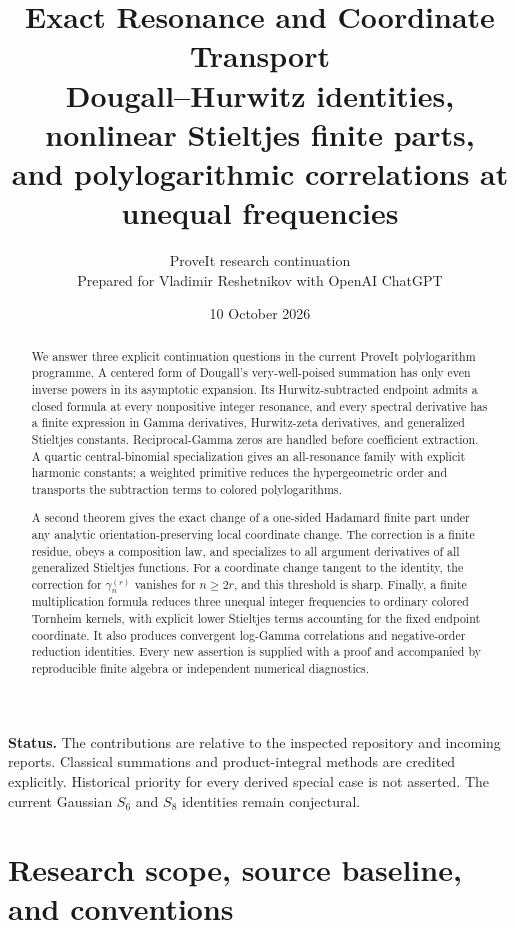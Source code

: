 \documentclass[11pt,a4paper]{article}
\title{\textbf{Exact Resonance and Coordinate Transport}\\[6pt]
\large Dougall--Hurwitz identities, nonlinear Stieltjes finite parts,\\
and polylogarithmic correlations at unequal frequencies}
\author{ProveIt research continuation\\
\small Prepared for Vladimir Reshetnikov with OpenAI ChatGPT}
\date{10 October 2026}
\numberwithin{equation}{section}
\theoremstyle{definition}
\theoremstyle{remark}
\begin{document}
\maketitle
\begin{abstract}
We answer three explicit continuation questions in the current ProveIt
polylogarithm programme. A centered form of Dougall's very-well-poised
summation has only even inverse powers in its asymptotic expansion. Its
Hurwitz-subtracted endpoint admits a closed formula at every nonpositive
integer resonance, and every spectral derivative has a finite expression
in Gamma derivatives, Hurwitz-zeta derivatives, and generalized Stieltjes
constants. Reciprocal-Gamma zeros are handled before coefficient extraction.
A quartic central-binomial specialization gives an all-resonance family
with explicit harmonic constants; a weighted primitive reduces the
hypergeometric order and transports the subtraction terms to colored
polylogarithms.

A second theorem gives the exact change of a one-sided Hadamard finite
part under any analytic orientation-preserving local coordinate change.
The correction is a finite residue, obeys a composition law, and specializes
to all argument derivatives of all generalized Stieltjes functions.
For a coordinate change tangent to the identity, the correction for
$\gamma_n^{(r)}$ vanishes for $n\ge 2r$, and this threshold is sharp.
Finally, a finite multiplication formula reduces three unequal integer
frequencies to ordinary colored Tornheim kernels, with explicit lower
Stieltjes terms accounting for the fixed endpoint coordinate. It also
produces convergent log-Gamma correlations and negative-order reduction
identities. Every new assertion is supplied with a proof and accompanied
by reproducible finite algebra or independent numerical diagnostics.
\end{abstract}

\noindent\textbf{Status.} The contributions are relative to the inspected
repository and incoming reports. Classical summations and product-integral
methods are credited explicitly. Historical priority for every derived
special case is not asserted. The current Gaussian $S_6$ and $S_8$
identities remain conjectural.
\clearpage
\tableofcontents
\clearpage

\section{Research scope, source baseline, and conventions}
\label{sec:scope}
\end{document}
